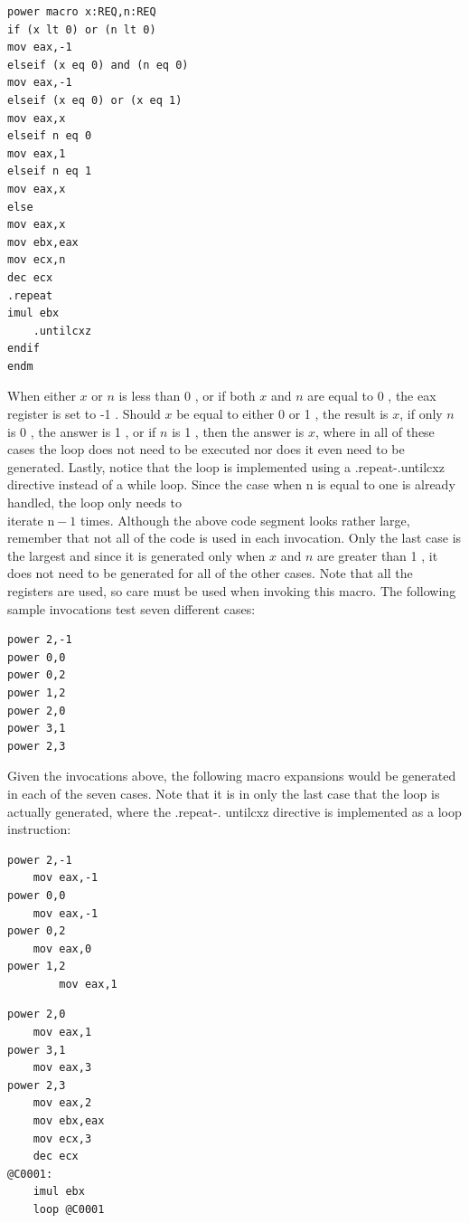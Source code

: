 \documentclass[10pt]{book}
\begin{document}
\begin{verbatim}
power macro x:REQ,n:REQ
if (x lt 0) or (n lt 0)
mov eax,-1
elseif (x eq 0) and (n eq 0)
mov eax,-1
elseif (x eq 0) or (x eq 1)
mov eax,x
elseif n eq 0
mov eax,1
elseif n eq 1
mov eax,x
else
mov eax,x
mov ebx,eax
mov ecx,n
dec ecx
.repeat
imul ebx
    .untilcxz
endif
endm
\end{verbatim}

When either $x$ or $n$ is less than 0 , or if both $x$ and $n$ are equal to 0 , the eax register is set to -1 . Should $x$ be equal to either 0 or 1 , the result is $x$, if only $n$ is 0 , the answer is 1 , or if $n$ is 1 , then the answer is $x$, where in all of these cases the loop does not need to be executed nor does it even need to be generated. Lastly, notice that the loop is implemented using a .repeat-.untilcxz directive instead of a while loop. Since the case when n is equal to one is already handled, the loop only needs to\\
iterate $\mathrm{n}-1$ times. Although the above code segment looks rather large, remember that not all of the code is used in each invocation. Only the last case is the largest and since it is generated only when $x$ and $n$ are greater than 1 , it does not need to be generated for all of the other cases. Note that all the registers are used, so care must be used when invoking this macro. The following sample invocations test seven different cases:


\begin{verbatim}
power 2,-1
power 0,0
power 0,2
power 1,2
power 2,0
power 3,1
power 2,3
\end{verbatim}

Given the invocations above, the following macro expansions would be generated in each of the seven cases. Note that it is in only the last case that the loop is actually generated, where the .repeat-. untilcxz directive is implemented as a loop instruction:

\begin{verbatim}
power 2,-1
    mov eax,-1
power 0,0
    mov eax,-1
power 0,2
    mov eax,0
power 1,2
        mov eax,1
\end{verbatim}

\begin{verbatim}
power 2,0
    mov eax,1
power 3,1
    mov eax,3
power 2,3
    mov eax,2
    mov ebx,eax
    mov ecx,3
    dec ecx
@C0001:
    imul ebx
    loop @C0001
\end{verbatim}
\end{document}
